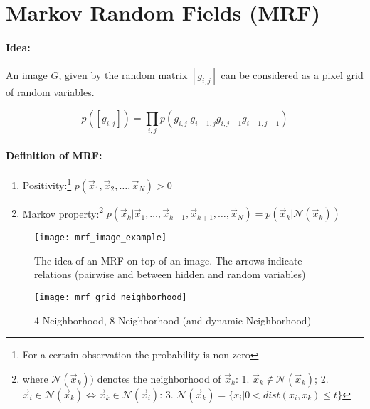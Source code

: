 
\section*{Markov Random Fields (MRF)}

\paragraph{Idea:} An image $G$, given by the random matrix $[g_{i,j}]$ can be considered as a pixel grid of random variables.


\begin{equation*}
    p([g_{i, j}]) = \prod_{i,j} p(g_{i, j} | g_{i-1, j} g_{i, j-1} g_{i-1, j-1})
\end{equation*}

\paragraph{Definition of MRF:}
\begin{enumerate}
    \item Positivity:\footnote{For a certain observation the probability is non zero} $ p(\vec{x}_1, \vec{x}_2, \dots, \vec{x}_N) > 0$
    \item Markov property:\footnote{where $\mathcal{N}(\vec{x}_k))$ denotes the neighborhood of $\vec{x}_k$: 1. $\vec{x}_k \notin \mathcal{N}(\vec{x}_k)$; 2. $\vec{x}_i \in \mathcal{N}(\vec{x}_k) \Leftrightarrow \vec{x}_k \in \mathcal{N}(\vec{x}_i)$: 3. $\mathcal{N}(\vec{x}_k) = \{x_i|0 < dist(x_i, x_k) \le t\}$} $ p(\vec{x}_k |\vec{x}_1, \dots, \vec{x}_{k-1}, \vec{x}_{k+1}, \dots, \vec{x}_N) = p(\vec{x}_k | \mathcal{N}(\vec{x}_k)) $
\end{enumerate}


\begin{figure}[H]
  \centering
  \begin{minipage}[b]{0.45\textwidth}
    \texttt{[image: mrf\_image\_example]}
		\caption{The idea of an MRF on top of an image. The arrows indicate relations (pairwise and between hidden and random variables)}
  \end{minipage}
  \begin{minipage}[b]{0.45\textwidth}
    \texttt{[image: mrf\_grid\_neighborhood]}
		\caption{4-Neighborhood, 8-Neighborhood (and dynamic-Neighborhood)}
  \end{minipage}
\end{figure}

